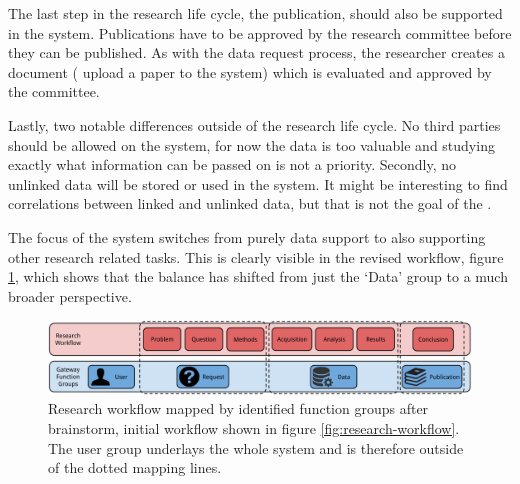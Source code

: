 The last step in the research life cycle, the publication, should also be supported in the system.
Publications have to be approved by the research committee before they can be published.
As with the data request process, the researcher creates a document (\ie{} upload a paper to the system) which is evaluated and approved by the committee.

Lastly, two notable differences outside of the research life cycle.
No third parties should be allowed on the system, for now the data is too valuable and studying exactly what information can be passed on is not a priority.
Secondly, no unlinked data will be stored or used in the system.
It might be interesting to find correlations between linked and unlinked data, but that is not the goal of the \project{}.

The focus of the system switches from purely data support to also supporting other research related tasks.
This is clearly visible in the revised workflow, figure \ref{fig:research-workflow-after}, which shows that the balance has shifted from just the `Data' group to a much broader perspective.

\begin{figure}[hb]
	\centering
	\includegraphics[width=1.0\linewidth]{images/research-workflow-after}
	\caption{
		Research workflow mapped by identified function groups after brainstorm, initial workflow shown in figure \ref{fig:research-workflow}.
		The user group underlays the whole system and is therefore outside of the dotted mapping lines.
	}
	\label{fig:research-workflow-after}
\end{figure}